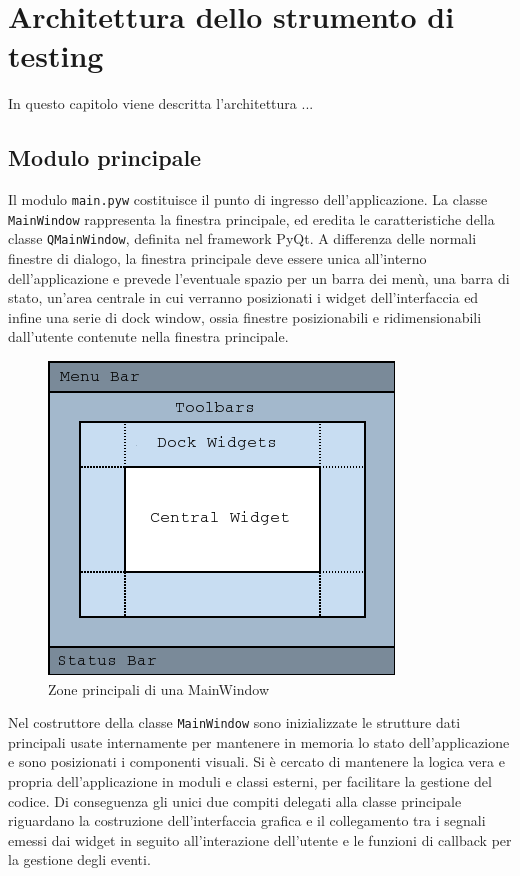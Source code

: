 \chapter{Architettura dello strumento di testing}

In questo capitolo viene descritta l'architettura ...

\section{Modulo principale}

Il modulo \verb|main.pyw| costituisce il punto di ingresso dell'applicazione. La classe \verb|MainWindow| rappresenta la finestra principale, ed eredita le caratteristiche della classe \verb|QMainWindow|, definita nel framework PyQt. A differenza delle normali finestre di dialogo, la finestra principale deve essere unica all'interno dell'applicazione e prevede l'eventuale spazio per un barra dei menù, una barra di stato, un'area centrale in cui verranno posizionati i widget dell'interfaccia ed infine una serie di dock window, ossia finestre posizionabili e ridimensionabili dall'utente contenute nella finestra principale.

\begin{figure}[htbp]
\begin{center}
\includegraphics{images/mainwindowlayout.png}
\caption{Zone principali di una MainWindow}
\label{fig:pyqtMainWindow}
\end{center}
\end{figure}

Nel costruttore della classe \verb|MainWindow| sono inizializzate le strutture dati principali usate internamente per mantenere in memoria lo stato dell'applicazione e sono posizionati i componenti visuali. Si è cercato di mantenere la logica vera e propria dell'applicazione in moduli e classi esterni, per facilitare la gestione del codice. Di conseguenza gli unici due compiti delegati alla classe principale riguardano la costruzione dell'interfaccia grafica e il collegamento tra i segnali emessi dai widget in seguito all'interazione dell'utente e le funzioni di callback per la gestione degli eventi.

